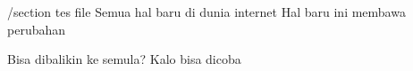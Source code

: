 /section tes file
	Semua hal baru di dunia internet
Hal baru ini membawa perubahan

Bisa dibalikin ke semula?
Kalo bisa dicoba